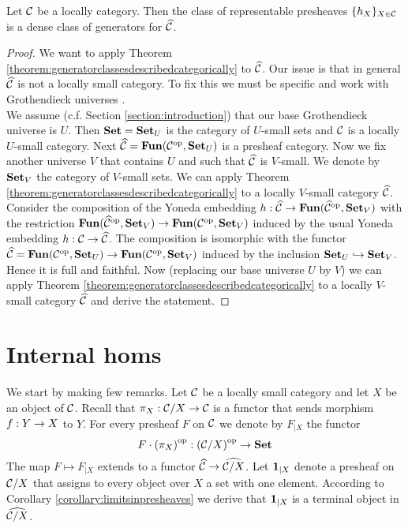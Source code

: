 \begin{corollary}\label{corollary:representablesaredensegenerators}
Let ${\mathcal C}$ be a locally category. Then the class of representable presheaves $\{h_X\}_{X\in {\mathcal C}}$ is a dense class of generators for $\widehat{{\mathcal C}}$.
\end{corollary}
\begin{proof}
We want to apply Theorem \ref{theorem:generatorclassesdescribedcategorically} to $\widehat{{\mathcal C}}$. Our issue is that in general $\widehat{{\mathcal C}}$ is not a locally small category. To fix this we must be specific and work with Grothendieck universes {\cite[page 22]{Maclane}}.\\
We assume (c.f. Section \ref{section:introduction}) that our base Grothendieck universe is $U$. Then $\mathbf{Set} = \mathbf{Set}_{U}$ is the category of $U$-small sets and ${\mathcal C}$ is a locally $U$-small category. Next $\widehat{{\mathcal C}} = \mathbf{Fun}({\mathcal C}^{\mathrm{op}},\mathbf{Set}_{U})$ is a presheaf category. Now we fix another universe $V$ that contains $U$ and such that $\widehat{{\mathcal C}}$ is $V$-small. We denote by $\mathbf{Set}_V$ the category of $V$-small sets. We can apply Theorem \ref{theorem:generatorclassesdescribedcategorically} to a locally $V$-small category $\widehat{{\mathcal C}}$. Consider the composition of the Yoneda embedding $h:\widehat{{\mathcal C}}\rightarrow \mathbf{Fun}(\widehat{{\mathcal C}}^{\mathrm{op}},\mathbf{Set}_V)$ with the restriction $\mathbf{Fun}(\widehat{{\mathcal C}}^{\mathrm{op}},\mathbf{Set}_V)\rightarrow \mathbf{Fun}({\mathcal C}^{\mathrm{op}},\mathbf{Set}_V)$ induced by the usual Yoneda embedding $h:{\mathcal C}\rightarrow \widehat{{\mathcal C}}$. The composition is isomorphic with the functor $\widehat{{\mathcal C}} = \mathbf{Fun}({\mathcal C}^{\mathrm{op}},\mathbf{Set}_U)\rightarrow \mathbf{Fun}({\mathcal C}^{\mathrm{op}},\mathbf{Set}_V)$ induced by the inclusion $\mathbf{Set}_U\hookrightarrow \mathbf{Set}_V$. Hence it is full and faithful. Now (replacing our base universe $U$ by $V$) we can apply Theorem \ref{theorem:generatorclassesdescribedcategorically} to a locally $V$-small category $\widehat{{\mathcal C}}$ and derive the statement.
\end{proof}

\section{Internal homs}
\noindent
We start by making few remarks. Let ${\mathcal C}$ be a locally small category and let $X$ be an object of ${\mathcal C}$. Recall that $\pi_X:{\mathcal C}/X\rightarrow {\mathcal C}$ is a functor that sends morphism $f:Y\rightarrow X$ to $Y$. For every presheaf $F$ on ${\mathcal C}$ we denote by $F_{\mid X}$ the functor
$$F\cdot \left(\pi_X\right)^{\mathrm{op}}:\left({\mathcal C}/X\right)^{\mathrm{op}}\rightarrow \mathbf{Set}$$
The map $F\mapsto F_{\mid X}$ extends to a functor $\widehat{{\mathcal C}}\rightarrow \widehat{{\mathcal C}/X}$.  Let $\mathbf{1}_{\mid X}$ denote a presheaf on ${\mathcal C}/X$ that assigns to every object over $X$ a set with one element. According to Corollary \ref{corollary:limitsinpresheaves} we derive that $\mathbf{1}_{\mid X}$ is a terminal object in $\widehat{{\mathcal C}/X}$. 

